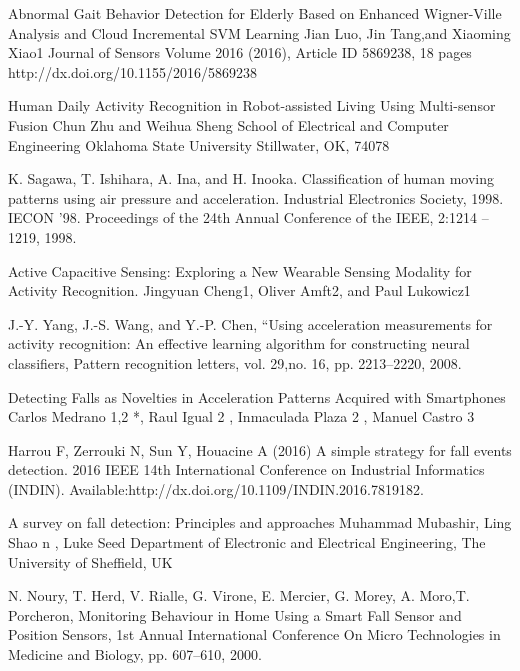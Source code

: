 \documentclass[a4paper, parskip=full]{scrartcl}
\begin{document}
\newpage
\begin{thebibliography}{9}
	

	

Abnormal Gait Behavior Detection for Elderly Based on Enhanced Wigner-Ville Analysis and Cloud Incremental SVM Learning
Jian Luo, Jin Tang,and Xiaoming Xiao1
Journal of Sensors Volume 2016 (2016), Article ID 5869238, 18 pages
http://dx.doi.org/10.1155/2016/5869238



Human Daily Activity Recognition in Robot-assisted Living Using Multi-sensor Fusion
Chun Zhu and Weihua Sheng
School of Electrical and Computer Engineering Oklahoma State University
Stillwater, OK, 74078



K. Sagawa, T. Ishihara, A. Ina, and H. Inooka. Classification of human moving patterns using air pressure and acceleration. Industrial Electronics Society, 1998. IECON ’98. Proceedings of the 24th Annual Conference of the IEEE, 2:1214 – 1219, 1998.


 Active Capacitive Sensing: Exploring a New Wearable Sensing Modality for Activity Recognition. Jingyuan Cheng1, Oliver Amft2, and Paul Lukowicz1


 J.-Y. Yang, J.-S. Wang, and Y.-P. Chen, “Using acceleration measurements for activity recognition: An effective learning algorithm for constructing neural classifiers, Pattern recognition letters, vol. 29,no. 16, pp. 2213–2220, 2008.

Detecting Falls as Novelties in Acceleration Patterns Acquired with Smartphones
Carlos Medrano 1,2 *, Raul Igual 2 , Inmaculada Plaza 2 , Manuel Castro 3


Harrou F, Zerrouki N, Sun Y, Houacine A (2016) A simple strategy for fall events detection. 2016 IEEE 14th International Conference on Industrial Informatics
(INDIN). Available:http://dx.doi.org/10.1109/INDIN.2016.7819182.


A survey on fall detection: Principles and approaches Muhammad Mubashir, Ling Shao n , Luke Seed Department of Electronic and Electrical Engineering, The University of Sheffield, UK

N. Noury, T. Herd, V. Rialle, G. Virone, E. Mercier, G. Morey, A. Moro,T. Porcheron, Monitoring Behaviour in Home Using a Smart Fall Sensor and Position Sensors, 1st Annual International Conference On Micro Technologies in Medicine and Biology, pp. 607–610, 2000.


\end{thebibliography}
\end{document}

